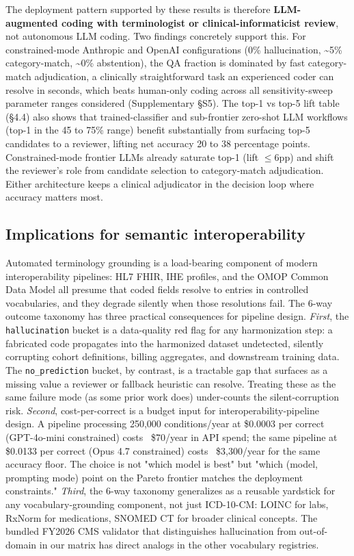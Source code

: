 The deployment pattern supported by these results is therefore
\textbf{LLM-augmented coding with terminologist or
clinical-informaticist review}, not autonomous LLM coding. Two
findings concretely support this. For constrained-mode Anthropic
and OpenAI configurations (0\% hallucination, \textasciitilde5\% category-match,
\textasciitilde0\% abstention), the QA fraction is dominated by fast
category-match adjudication, a clinically straightforward task an
experienced coder can resolve in seconds, which beats human-only
coding across all sensitivity-sweep parameter ranges considered
(Supplementary §S5). The top-1 vs top-5 lift table (§4.4) also
shows that trained-classifier and sub-frontier zero-shot LLM
workflows (top-1 in the 45 to 75\% range) benefit substantially
from surfacing top-5 candidates to a reviewer, lifting net
accuracy 20 to 38 percentage points. Constrained-mode frontier
LLMs already saturate top-1 (lift $\leq$6pp) and shift the reviewer's
role from candidate selection to category-match adjudication.
Either architecture keeps a clinical adjudicator in the decision
loop where accuracy matters most.

\subsection{Implications for semantic interoperability}\label{implications-for-semantic-interoperability}

Automated terminology grounding is a load-bearing component of
modern interoperability pipelines: HL7 FHIR, IHE profiles, and the
OMOP Common Data Model all presume that coded fields resolve to
entries in controlled vocabularies, and they degrade silently when
those resolutions fail. The 6-way outcome taxonomy has three
practical consequences for pipeline design. \emph{First}, the
\texttt{hallucination} bucket is a data-quality red flag for any
harmonization step: a fabricated code propagates into the
harmonized dataset undetected, silently corrupting cohort
definitions, billing aggregates, and downstream training data. The
\texttt{no\_prediction} bucket, by contrast, is a tractable gap
that surfaces as a missing value a reviewer or fallback heuristic
can resolve. Treating these as the same failure mode (as some prior
work does) under-counts the silent-corruption risk. \emph{Second},
cost-per-correct is a budget input for interoperability-pipeline
design. A pipeline processing 250,000 conditions/year at \$0.0003
per correct (GPT-4o-mini constrained) costs ~\$70/year in API
spend; the same pipeline at \$0.0133 per correct (Opus 4.7
constrained) costs ~\$3,300/year for the same accuracy floor. The
choice is not "which model is best" but "which (model, prompting
mode) point on the Pareto frontier matches the deployment
constraints." \emph{Third}, the 6-way taxonomy generalizes as a
reusable yardstick for any vocabulary-grounding component, not just
ICD-10-CM: LOINC for labs, RxNorm for medications, SNOMED CT for
broader clinical concepts. The bundled FY2026 CMS validator that
distinguishes hallucination from out-of-domain in our matrix has
direct analogs in the other vocabulary registries.

